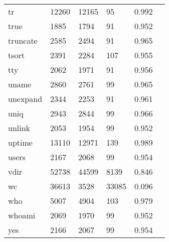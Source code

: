 \begin{longtable}{lp{2.20cm}p{2.20cm}p{2.20cm}p{2.20cm}p{2.20cm}}
tr        &                    12260 &        12165 &            95 &                    0.992 \\
true      &                     1885 &         1794 &            91 &                    0.952 \\
truncate  &                     2585 &         2494 &            91 &                    0.965 \\
tsort     &                     2391 &         2284 &           107 &                    0.955 \\
tty       &                     2062 &         1971 &            91 &                    0.956 \\
uname     &                     2860 &         2761 &            99 &                    0.965 \\
unexpand  &                     2344 &         2253 &            91 &                    0.961 \\
uniq      &                     2943 &         2844 &            99 &                    0.966 \\
unlink    &                     2053 &         1954 &            99 &                    0.952 \\
uptime    &                    13110 &        12971 &           139 &                    0.989 \\
users     &                     2167 &         2068 &            99 &                    0.954 \\
vdir      &                    52738 &        44599 &          8139 &                    0.846 \\
wc        &                    36613 &         3528 &         33085 &                    0.096 \\
who       &                     5007 &         4904 &           103 &                    0.979 \\
whoami    &                     2069 &         1970 &            99 &                    0.952 \\
yes       &                     2166 &         2067 &            99 &                    0.954 \\
\end{longtable}
